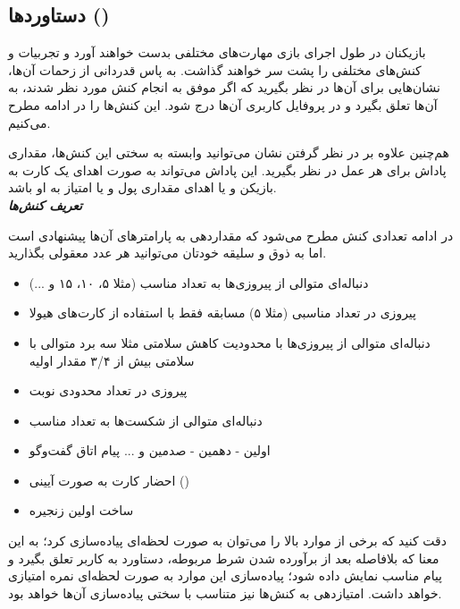 \documentclass[]{article}
\begin{document}
\subsection*{{\titr دستاورد‌ها ()}}

بازیکنان در طول اجرای بازی مهارت‌های مختلفی بدست خواهند آورد و تجربیات و کنش‌های مختلفی را پشت سر خواهند گذاشت. به پاس قدردانی از زحمات آن‌ها، نشان‌هایی برای آن‌ها در نظر بگیرید که اگر موفق به انجام کنش مورد نظر شدند، به آن‌ها تعلق بگیرد و در پروفایل کاربری آن‌ها درج شود. این کنش‌ها را در ادامه مطرح می‌کنیم.

هم‌چنین علاوه بر در نظر گرفتن نشان می‌توانید وابسته به سختی این کنش‌ها، مقداری پاداش برای هر عمل در نظر بگیرید. این پاداش می‌تواند به صورت اهدای یک کارت به بازیکن و یا اهدای مقداری پول و یا امتیاز به او باشد.
\\
\newpage
\textbf{\emph{تعریف کنش‌ها}}

در ادامه تعدادی کنش مطرح می‌شود که مقداردهی به پارامترهای آن‌ها پیشنهادی است اما به ذوق و سلیقه خودتان می‌توانید هر عدد معقولی بگذارید.

\begin{itemize}
	\item دنباله‌ای متوالی از پیروزی‌ها به تعداد مناسب‌ (مثلا ۵، ۱۰، ۱۵ و ...)
	\item پیروزی در تعداد مناسبی‌ (مثلا ۵) مسابقه فقط با استفاده از کارت‌های هیولا
	\item دنباله‌ای متوالی از پیروزی‌ها با محدودیت کاهش سلامتی مثلا سه برد متوالی با سلامتی بیش از ۳/۴ مقدار اولیه
	\item پیروزی در تعداد محدودی نوبت
	\item دنباله‌ای متوالی از شکست‌ها به تعداد مناسب
	\item اولین - دهمین - صدمین و ... پیام اتاق گفت‌وگو
	\item احضار کارت به صورت آیینی ()
	\item ساخت اولین زنجیره
\end{itemize}


\begin{tcolorbox}[colback=green!5!white,colframe=green!75!black,title=\textbf{نکته}]
	دقت کنید که برخی از موارد بالا را می‌توان به صورت لحظه‌ای  پیاده‌سازی کرد؛ به این معنا که بلافاصله بعد از برآورده شدن شرط مربوطه، دستاورد به کاربر تعلق بگیرد و پیام مناسب نمایش داده شود؛ پیاده‌سازی این موارد به صورت لحظه‌ای نمره امتیازی خواهد داشت. امتیازدهی به کنش‌ها نیز متناسب با سختی پیاده‌سازی آن‌ها خواهد بود.
\end{tcolorbox}
\end{document}
